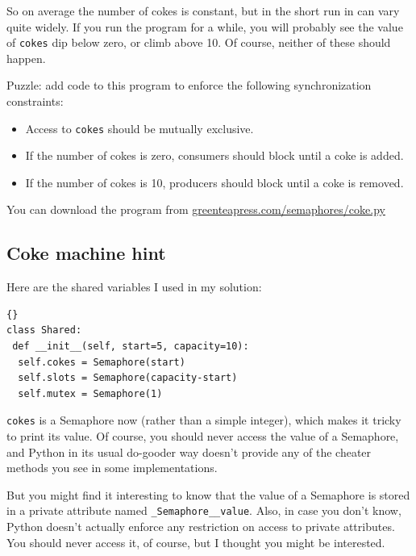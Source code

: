 \documentclass{book}
\begin{document}
So on average the number of cokes is constant, but in the short
run in can vary quite widely.  If you run the program for a
while, you will probably see the value of {\tt cokes} dip
below zero, or climb above 10.  Of course, neither of these
should happen.

Puzzle: add code to this program to enforce the following
synchronization constraints:

\begin{itemize}

    \item Access to {\tt cokes} should be mutually exclusive.

    \item If the number of cokes is zero, consumers should block
          until a coke is added.

    \item If the number of cokes is 10, producers should block
          until a coke is removed.

\end{itemize}

You can download the program from
\url{greenteapress.com/semaphores/coke.py}



\subsection {Coke machine hint}

Here are the shared variables I used in my solution:

\begin{lstlisting}[title={}]{}
class Shared:
 def __init__(self, start=5, capacity=10):
  self.cokes = Semaphore(start)
  self.slots = Semaphore(capacity-start)
  self.mutex = Semaphore(1)
\end{lstlisting}

{\tt cokes} is a Semaphore now (rather than a simple integer),
which makes it tricky to print its value.  Of course, you
should never access the value of a Semaphore, and Python in
its usual do-gooder way doesn't provide any of the cheater
methods you see in some implementations.

But you might find it interesting to know that the value
of a Semaphore is stored in a private attribute named
    {\tt \_Semaphore\_\_value}.  Also, in case you don't know,
Python doesn't actually enforce any restriction on access to
private attributes.  You should never access it, of course,
but I thought you might be interested.
\end{document}
